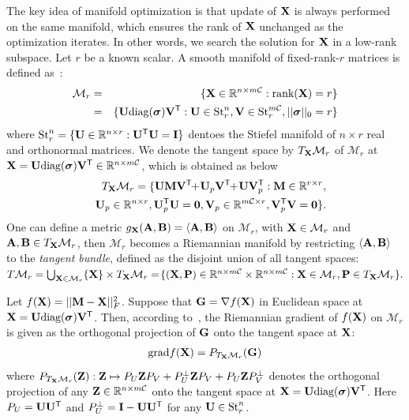 \documentclass[10pt,twocolumn,letterpaper]{article}
\def\M{\mathcal{M}}
\def\R{{\mathbb R}}
\def\U{{\bf U}}
\def\V{{\bf V}}
\def\diag{\mbox{diag}}
\def\bsigma{\mbox{{\boldmath $\sigma$}}}
\def\trsp{{\sf T}}
\def\I{{\bf I}}
\def\0{{\bf 0}}
\def\G{{\bf G}}
\def\grad{{\text{grad}}}
\def\bZ{{\bf Z}}
\def\bB{{\bf B}}
\def\bM{{\bf M}}
\def\calC{{\mathcal{C}}}
\def\bX{{\bf X}}
\def\bA{{\bf A}}
\def\bX{{\bf X}}
\def\bP{{\bf P}}
\def\rank{{\text{rank}}}
\begin{document}
The key idea of manifold optimization is that update of $\bX$ is always performed on the same manifold, which ensures the rank of $\bX$ unchanged as the optimization iterates.
In other words, we search the solution for $\bX$ in a low-rank subspace.
Let $r$ be a known scalar.
A smooth manifold of fixed-rank-$r$ matrices is defined as~\cite{vandereycken2013lowrank}:
{\small
\begin{align}
\M_{r} &=& \{\bX\in \R^{n\times m\calC}: \rank(\bX) = r\} \nonumber \\
       &=& \{\U\diag(\bsigma)\V^{\trsp}: \U \in \textrm{St}_{r}^{n}, \V \in
           \textrm{St}_{r}^{m\calC}, ||\bsigma||_0 = r\} \nonumber
\end{align}
}
\noindent
where $\textrm{St}_{r}^{n} = \{\U \in \R^{n\times r}:
\U^{\trsp}\U = \I \}$ dentoes the Stiefel manifold of $n\times r$ real and orthonormal matrices.
We denote the tangent space by $T_{\bX}\M_{r}$ of $\M_{r}$ at $\bX = \U\diag(\bsigma)\V^{\trsp} \in \R^{n \times m\calC}$,
which is obtained as below
{\small
\begin{align}
\label{eq:tangent_vector}
&&T_{\bX}\M_{r} =  \{\U\bM\V^{\trsp} \!\!+\! \U_p\V^{\trsp} \!\!+\!
\U\V_p^{\trsp}: \bM \in \R^{r\times r}, \nonumber\\ && \U_p \in \R^{n\times r},
\U_p^{\trsp}\U = \0, \V_p \in \R^{m\calC \times r}, \V_p^{\trsp}\V = \0\}.
\end{align}
}
\noindent
One can define a metric $g_{\bX}({\bA},{\bB}) = \langle{\bA},{\bB}\rangle$ on $\M_{r}$,
with $\bX \in \M_{r}$ and ${\bA},{\bB} \in T_{\bX}\M_{r}$,
then $\M_{r}$ becomes a Riemannian manifold by restricting
$\langle\bA,\bB\rangle$
to the \emph{tangent bundle}, defined as the disjoint union of all tangent spaces:
$T\M_{r} = \bigcup_{\bX\in \M_{r}}\{\bX\} \times T_{\bX}\M_{r}
         = \! \{(\bX,\bP)\in \R^{n \times m\calC} \times \R^{n \times m\calC}: \bX \in \M_{r}, \bP \in T_{\bX}\M_{r}\}.$


Let $f(\bX) = || \bM - \bX ||_F^2$.
Suppose that $\G = \nabla f(\bX)$ in Euclidean space at $\bX = \U\diag(\bsigma)\V^{\trsp}$.
Then, according to~\cite{vandereycken2013lowrank}, the Riemannian gradient of $f(\bX)$ on $\M_r$ is given as the orthogonal
projection of $\G$ onto the tangent space at $\bX$:
{\small
\begin{eqnarray}\label{eq:grad}
\grad{f(\bX)} = P_{T_{\bX}\M_{r}}(\G)
\end{eqnarray}
}
\noindent
where
$P_{T_{\bX}\M_{r}}(\bZ): \bZ \mapsto P_{U}\bZ P_{V} + P_{U}^{\perp} \bZ P_{V} + P_{U} \bZ P_{V}^{\perp}$
denotes the orthogonal projection of any
$\bZ \in \R^{n \times m\calC}$ onto the tangent space at $\bX = \U\diag(\bsigma)\V^{\trsp}$.
Here $P_U = \U \U^{\trsp}$ and $P_U^{\perp} = \I - \U \U^{\trsp}$ for any $\U \in \textrm{St}_{r}^{n}$.
\end{document}
